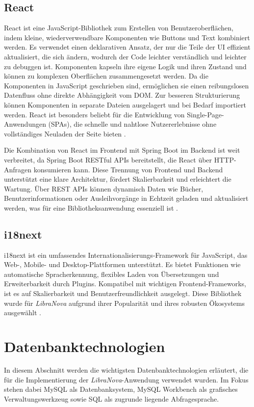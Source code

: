 \subsection{React}

React ist eine JavaScript-Bibliothek zum Erstellen von Benutzeroberflächen, indem kleine, wiederverwendbare Komponenten wie Buttons und Text kombiniert werden. Es verwendet einen deklarativen Ansatz, der nur die Teile der UI effizient aktualisiert, die sich ändern, wodurch der Code leichter verständlich und leichter zu debuggen ist. Komponenten kapseln ihre eigene Logik und ihren Zustand und können zu komplexen Oberflächen zusammengesetzt werden. Da die Komponenten in JavaScript geschrieben sind, ermöglichen sie einen reibungslosen Datenfluss ohne direkte Abhängigkeit vom DOM. Zur besseren Strukturierung können Komponenten in separate Dateien ausgelagert und bei Bedarf importiert werden. React ist besonders beliebt für die Entwicklung von Single-Page-Anwendungen (SPAs), die schnelle und nahtlose Nutzererlebnisse ohne vollständiges Neuladen der Seite bieten \cite{REACT2025a, REACT2025b, REACT2025c}. 

\noindent Die Kombination von React im Frontend mit Spring Boot im Backend ist weit verbreitet, da Spring Boot RESTful APIs bereitstellt, die React über HTTP-Anfragen konsumieren kann. Diese Trennung von Frontend und Backend unterstützt eine klare Architektur, fördert Skalierbarkeit und erleichtert die Wartung. Über REST APIs können dynamisch Daten wie Bücher, Benutzerinformationen oder Ausleihvorgänge in Echtzeit geladen und aktualisiert werden, was für eine Bibliotheksanwendung essenziell ist \cite{SPRINGBOOTREACT2025}. 

\subsection{i18next}
i18next ist ein umfassendes Internationalisierungs-Framework für JavaScript, das Web-, Mobile- und Desktop-Plattformen unterstützt. Es bietet Funktionen wie automatische Spracherkennung, flexibles Laden von Übersetzungen und Erweiterbarkeit durch Plugins. Kompatibel mit wichtigen Frontend-Frameworks, ist es auf Skalierbarkeit und Benutzerfreundlichkeit ausgelegt. Diese Bibliothek wurde für \textit{LibraNova} aufgrund ihrer Popularität und ihres robusten Ökosystems ausgewählt \cite{i18NEXT2025}. 

\section{Datenbanktechnologien}
In diesem Abschnitt werden die wichtigsten Datenbanktechnologien erläutert, die für die Implementierung der \textit{LibraNova}-Anwendung verwendet wurden. Im Fokus stehen dabei MySQL als Datenbanksystem, MySQL Workbench als grafisches Verwaltungswerkzeug sowie SQL als zugrunde liegende Abfragesprache.

